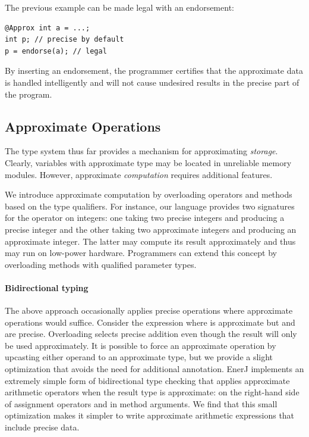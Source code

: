 The previous example can be made legal with an endorsement:
\begin{lstlisting}
@Approx int a = ...;
int p; // precise by default
p = endorse(a); // legal
\end{lstlisting}
By inserting an endorsement,
the programmer certifies that the approximate data is handled
intelligently and will not cause undesired results in the precise part of
the program.


\subsection{Approximate Operations}
\label{enerj:sec:approx}

The type system thus far provides a mechanism for approximating
\emph{storage}. Clearly, variables with approximate type may be
located in unreliable memory modules. However,
approximate \emph{computation} requires additional features. %

We introduce approximate computation by overloading operators and
methods based on the type qualifiers. For instance, our
language provides two signatures for the \ilcode{+} operator on
integers: one taking two precise integers and producing a precise
integer and the other taking two approximate integers and producing an
approximate integer. The latter may compute its result
approximately and thus may run on low-power hardware.
Programmers can extend this concept by overloading methods with
qualified parameter types.

\paragraph{Bidirectional typing}
The above approach occasionally applies precise operations where
approximate operations would suffice. Consider the expression 
where  is approximate but  and  are
precise. Overloading selects precise addition even
though the result will only be used approximately. It is possible to force
an approximate operation by upcasting either operand to an approximate
type, but we provide a slight optimization that avoids the need for additional
annotation.
EnerJ implements an extremely simple form of bidirectional type checking
\cite{bdtyping} that applies approximate arithmetic operators
when the result type is approximate: on the right-hand side of assignment
operators and in method arguments. We find that this small optimization makes
it simpler to write approximate arithmetic expressions that include precise
data.


